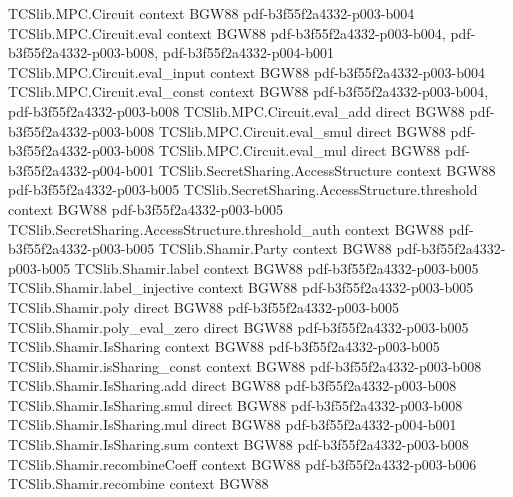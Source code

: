 \begin{theorem}
\label{TCSlib.MPC.BGW.bgwEval_isSharing}
\leanok
\proofstep
  {TCSlib.MPC.Circuit}
  {context}
  {BGW88}
  {pdf-b3f55f2a4332-p003-b004}
\proofstep
  {TCSlib.MPC.Circuit.eval}
  {context}
  {BGW88}
  {pdf-b3f55f2a4332-p003-b004,
    pdf-b3f55f2a4332-p003-b008,
    pdf-b3f55f2a4332-p004-b001}
\proofstep
  {TCSlib.MPC.Circuit.eval_input}
  {context}
  {BGW88}
  {pdf-b3f55f2a4332-p003-b004}
\proofstep
  {TCSlib.MPC.Circuit.eval_const}
  {context}
  {BGW88}
  {pdf-b3f55f2a4332-p003-b004,
    pdf-b3f55f2a4332-p003-b008}
\proofstep
  {TCSlib.MPC.Circuit.eval_add}
  {direct}
  {BGW88}
  {pdf-b3f55f2a4332-p003-b008}
\proofstep
  {TCSlib.MPC.Circuit.eval_smul}
  {direct}
  {BGW88}
  {pdf-b3f55f2a4332-p003-b008}
\proofstep
  {TCSlib.MPC.Circuit.eval_mul}
  {direct}
  {BGW88}
  {pdf-b3f55f2a4332-p004-b001}
\proofstep
  {TCSlib.SecretSharing.AccessStructure}
  {context}
  {BGW88}
  {pdf-b3f55f2a4332-p003-b005}
\proofstep
  {TCSlib.SecretSharing.AccessStructure.threshold}
  {context}
  {BGW88}
  {pdf-b3f55f2a4332-p003-b005}
\proofstep
  {TCSlib.SecretSharing.AccessStructure.threshold_auth}
  {context}
  {BGW88}
  {pdf-b3f55f2a4332-p003-b005}
\proofstep
  {TCSlib.Shamir.Party}
  {context}
  {BGW88}
  {pdf-b3f55f2a4332-p003-b005}
\proofstep
  {TCSlib.Shamir.label}
  {context}
  {BGW88}
  {pdf-b3f55f2a4332-p003-b005}
\proofstep
  {TCSlib.Shamir.label_injective}
  {context}
  {BGW88}
  {pdf-b3f55f2a4332-p003-b005}
\proofstep
  {TCSlib.Shamir.poly}
  {direct}
  {BGW88}
  {pdf-b3f55f2a4332-p003-b005}
\proofstep
  {TCSlib.Shamir.poly_eval_zero}
  {direct}
  {BGW88}
  {pdf-b3f55f2a4332-p003-b005}
\proofstep
  {TCSlib.Shamir.IsSharing}
  {context}
  {BGW88}
  {pdf-b3f55f2a4332-p003-b005}
\proofstep
  {TCSlib.Shamir.isSharing_const}
  {context}
  {BGW88}
  {pdf-b3f55f2a4332-p003-b008}
\proofstep
  {TCSlib.Shamir.IsSharing.add}
  {direct}
  {BGW88}
  {pdf-b3f55f2a4332-p003-b008}
\proofstep
  {TCSlib.Shamir.IsSharing.smul}
  {direct}
  {BGW88}
  {pdf-b3f55f2a4332-p003-b008}
\proofstep
  {TCSlib.Shamir.IsSharing.mul}
  {direct}
  {BGW88}
  {pdf-b3f55f2a4332-p004-b001}
\proofstep
  {TCSlib.Shamir.IsSharing.sum}
  {context}
  {BGW88}
  {pdf-b3f55f2a4332-p003-b008}
\proofstep
  {TCSlib.Shamir.recombineCoeff}
  {context}
  {BGW88}
  {pdf-b3f55f2a4332-p003-b006}
\proofstep
  {TCSlib.Shamir.recombine}
  {context}
  {BGW88}

\end{theorem}
